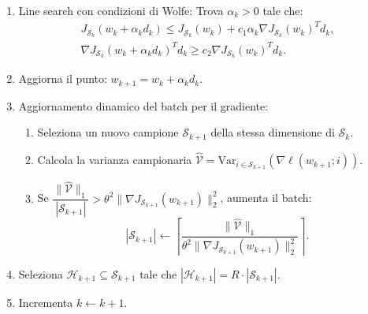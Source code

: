 \documentclass[a4paper,12pt]{article}
\newcommand{\Var}{\mathrm{Var}}
\begin{document}
\begin{actionbox}
\begin{enumerate}
    \item Line search con condizioni di Wolfe:
    Trova $\alpha_k > 0$ tale che:
    \[
    \begin{gathered}
    J_{\mathcal{S}_k}(w_k + \alpha_k d_k) \le J_{\mathcal{S}_k}(w_k) + c_1 \alpha_k \nabla J_{\mathcal{S}_k}(w_k)^T d_k,\\
    \nabla J_{\mathcal{S}_k}(w_k + \alpha_k d_k)^T d_k \ge c_2 \nabla J_{\mathcal{S}_k}(w_k)^T d_k.
    \end{gathered}
    \]
    
    \item Aggiorna il punto: $w_{k+1} = w_k + \alpha_k d_k$.
    
    \item Aggiornamento dinamico del batch per il gradiente:
    \begin{enumerate}
    \setlength{\itemsep}{0pt}\setlength{\topsep}{0pt}\setlength{\parskip}{0pt}
      \item Seleziona un nuovo campione $\mathcal{S}_{k+1}$ della stessa dimensione di $\mathcal{S}_k$.
      \item Calcola la varianza campionaria $\widehat{\mathcal{V}} = \Var_{i \in \mathcal{S}_{k+1}}(\nabla \ell(w_{k+1};i))$.
      \item Se $\dfrac{\|\widehat{\mathcal{V}}\|_1}{|\mathcal{S}_{k+1}|} > \theta^2 \|\nabla J_{\mathcal{S}_{k+1}}(w_{k+1})\|_2^2$, aumenta il batch:
      \[
      |\mathcal{S}_{k+1}| \leftarrow \left\lceil \dfrac{\|\widehat{\mathcal{V}}\|_1}{\theta^2 \|\nabla J_{\mathcal{S}_{k+1}}(w_{k+1})\|_2^2} \right\rceil.
      \]
    \end{enumerate}
    
    \item
    Seleziona $\mathcal{H}_{k+1} \subseteq \mathcal{S}_{k+1}$ tale che $|\mathcal{H}_{k+1}| = R \cdot |\mathcal{S}_{k+1}|$.
    
    \item Incrementa $k \leftarrow k+1$.
  \end{enumerate}
\end{actionbox}
\end{document}
